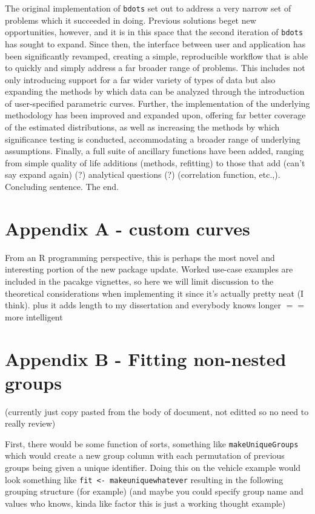 \documentclass{article}
\newcommand{\xt}{\texttt}%
\begin{document}
The original implementation of \xt{bdots} set out to address a very narrow set of problems which it succeeded in doing. Previous solutions beget new opportunities, however, and it is in this space that the second iteration of \xt{bdots} has sought to expand. Since then, the interface between user and application has been significantly revamped, creating a simple, reproducible workflow that is able to quickly and simply address a far broader range of problems. This includes not only introducing support for a far wider variety of types of data but also expanding the methods by which data can be analyzed through the introduction of user-specified parametric curves. Further, the implementation of the underlying methodology has been improved and expanded upon, offering far better coverage of the estimated distributions, as well as increasing the methods by which significance testing is conducted, accommodating a broader range of underlying assumptions. Finally, a full suite of ancillary functions have been added, ranging from simple quality of life additions (methods, refitting) to those that add (can't say expand again) (?) analytical questions (?) (correlation function, etc.,). Concluding sentence. The end.


\appendix

\section*{Appendix A - custom curves}

From an R programming perspective, this is perhaps the most novel and interesting portion of the new package update. Worked use-case examples are included in the pacakge vignettes, so here we will limit discussion to the theoretical considerations when implementing it since it's actually pretty neat (I think). plus it adds length to my dissertation and everybody knows longer $==$ more intelligent

\section*{Appendix B - Fitting non-nested groups}

(currently just copy pasted from the body of document, not editted so no need to really review)

First, there would be some function of sorts, something like \xt{makeUniqueGroups} which would create a new group column with each permutation of previous groups being given a unique identifier. Doing this on the vehicle example would look something like \xt{fit <- makeuniquewhatever} resulting in the following grouping structure (for example) (and maybe you could specify group name and values who knows, kinda like factor this is just a working thought example)
\end{document}
